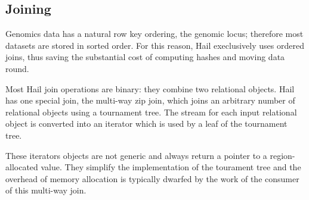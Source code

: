 \documentclass[sigconf, nonacm]{acmart}
\begin{document}
\subsection{Joining}

Genomics data has a natural row key ordering, the genomic locus; therefore most datasets are stored
in sorted order. For this reason, Hail execlusively uses ordered joins, thus saving the substantial
cost of computing hashes and moving data round.

Most Hail join operations are binary: they combine two relational objects. Hail has one special
join, the multi-way zip join, which joins an arbitrary number of relational objects using a
tournament tree. The stream for each input relational object is converted into an iterator which is
used by a leaf of the tournament tree.

These iterators objects are not generic and always return a pointer to a region-allocated
value. They simplify the implementation of the tourament tree and the overhead of memory allocation
is typically dwarfed by the work of the consumer of this multi-way join.









\end{document}
